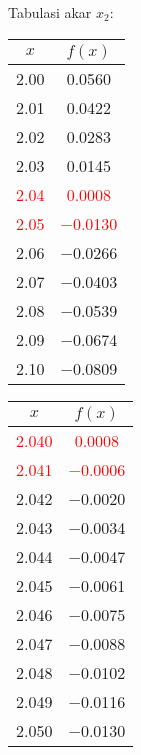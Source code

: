 \documentclass{article}
\begin{document}
\begin{enumerate}
\begin{enumerate}
        Tabulasi akar $x_2$: \\
        \begin{tabular}{|c|c|}
            \hline
            $x$   & $f(x)$ \\
            \hline
            \num{2,00} & \num{0,0560} \\
            \num{2,01} & \num{0,0422} \\
            \num{2,02} & \num{0,0283} \\
            \num{2,03} & \num{0,0145} \\
            \textcolor{red}{\num{2,04}} & \textcolor{red}{\num{0,0008}} \\
            \textcolor{red}{\num{2,05}} & \textcolor{red}{\num{-0,0130}} \\
            \num{2,06} & \num{-0,0266} \\
            \num{2,07} & \num{-0,0403} \\
            \num{2,08} & \num{-0,0539} \\
            \num{2,09} & \num{-0,0674} \\
            \num{2,10} & \num{-0,0809} \\
            \hline
            \end{tabular}\quad
            \begin{tabular}{|c|c|}
            \hline
            $x$   & $f(x)$ \\
            \hline
            \textcolor{red}{\num{2,040}} & \textcolor{red}{\num{0,0008}} \\
            \textcolor{red}{\num{2,041}} & \textcolor{red}{\num{-0,0006}} \\
            \num{2,042} & \num{-0,0020} \\
            \num{2,043} & \num{-0,0034} \\
            \num{2,044} & \num{-0,0047} \\
            \num{2,045} & \num{-0,0061} \\
            \num{2,046} & \num{-0,0075} \\
            \num{2,047} & \num{-0,0088} \\
            \num{2,048} & \num{-0,0102} \\
            \num{2,049} & \num{-0,0116} \\
            \num{2,050} & \num{-0,0130} \\
            \hline
            \end{tabular}\quad
            \begin{tabular}{|c|c|}

\end{tabular}
\end{enumerate}
\end{enumerate}
\end{document}
